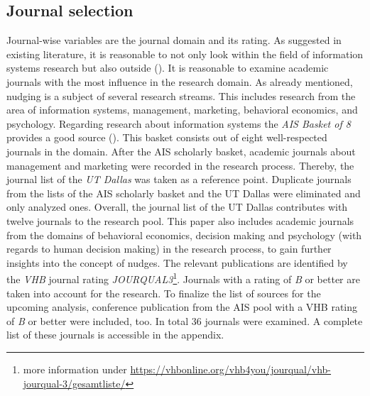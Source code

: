 \subsection{Journal selection}
Journal-wise variables are the journal domain and its rating. As suggested in existing literature, it is reasonable to not only look within the field of information systems research but also outside (\cite{webster_analyzing_2002}). It is reasonable to examine academic journals with the most influence in the research domain. As already mentioned, nudging is a subject of several research streams. This includes research from the area of information systems, management, marketing, behavioral economics, and psychology. Regarding research about information systems the \textit{AIS Basket of 8} provides a good source (\cite{alavi_review_1992}). This basket consists out of eight well-respected journals in the domain. After the AIS scholarly basket, academic journals about management and marketing were recorded in the research process. Thereby, the journal list of the \textit{UT Dallas} was taken as a reference point. Duplicate journals from the lists of the AIS scholarly basket and the UT Dallas were eliminated and only analyzed ones. Overall, the journal list of the UT Dallas contributes with twelve journals to the research pool. This paper also includes academic journals from the domains of behavioral economics, decision making and psychology (with regards to human decision making) in the research process, to gain further insights into the concept of nudges. The relevant publications are identified by the \textit{VHB} journal rating \textit{JOURQUAL3}\footnote{more information under \url{https://vhbonline.org/vhb4you/jourqual/vhb-jourqual-3/gesamtliste/}}. Journals with a rating of \textit{B} or better are taken into account for the research. To finalize the list of sources for the upcoming analysis, conference publication from the AIS pool with a VHB rating of \textit{B} or better were included, too. In total 36 journals were examined. A complete list of these journals is accessible in the appendix. %

